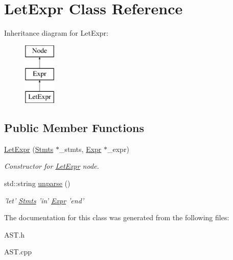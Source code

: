\hypertarget{classLetExpr}{\section{Let\-Expr Class Reference}
\label{classLetExpr}
}
Inheritance diagram for Let\-Expr\-:\begin{figure}[H]
\begin{center}
\leavevmode
\includegraphics[height=3.000000cm]{classLetExpr}
\end{center}
\end{figure}
\subsection*{Public Member Functions}
\begin{DoxyCompactItemize}
\item 
\hypertarget{classLetExpr_a9cb6116997c5d803d1872716c05937e1}{\hyperlink{classLetExpr_a9cb6116997c5d803d1872716c05937e1}{Let\-Expr} (\hyperlink{classStmts}{Stmts} $\ast$\-\_\-stmts, \hyperlink{classExpr}{Expr} $\ast$\-\_\-expr)}\label{classLetExpr_a9cb6116997c5d803d1872716c05937e1}

\begin{DoxyCompactList}\small\item\em Constructor for \hyperlink{classLetExpr}{Let\-Expr} node. \end{DoxyCompactList}\item 
\hypertarget{classLetExpr_a47e9e62ebec3114d50c127223fff126b}{std\-::string \hyperlink{classLetExpr_a47e9e62ebec3114d50c127223fff126b}{unparse} ()}\label{classLetExpr_a47e9e62ebec3114d50c127223fff126b}

\begin{DoxyCompactList}\small\item\em 'let' \hyperlink{classStmts}{Stmts} 'in' \hyperlink{classExpr}{Expr} 'end' \end{DoxyCompactList}\end{DoxyCompactItemize}


The documentation for this class was generated from the following files\-:\begin{DoxyCompactItemize}
\item 
A\-S\-T.\-h\item 
A\-S\-T.\-cpp\end{DoxyCompactItemize}
